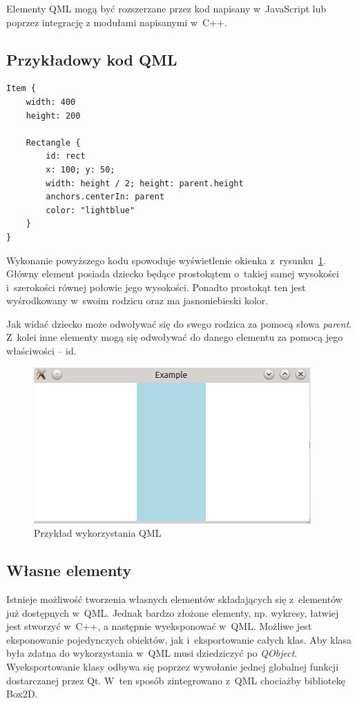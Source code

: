 Elementy QML mogą być rozszerzane przez kod napisany w~JavaScript lub poprzez integrację z modułami napisanymi w~C++.

\subsection{Przykładowy kod QML}

\begin{lstlisting}[caption=Przykład QML, label=code:qml]
Item {
	width: 400
	height: 200

	Rectangle {
		id: rect
		x: 100; y: 50;
		width: height / 2; height: parent.height
		anchors.centerIn: parent
		color: "lightblue"
	}
}
\end{lstlisting}

Wykonanie powyższego kodu spowoduje wyświetlenie okienka z~rysunku~\ref{rys:qml}. Główny element posiada dziecko będące prostokątem o~takiej samej wysokości i~szerokości równej połowie jego wysokości. Ponadto prostokąt ten jest wyśrodkowany w~swoim rodzicu oraz ma jasnoniebieski kolor.

Jak widać dziecko może odwoływać się do swego rodzica za pomocą słowa \textit{parent}. Z~kolei inne elementy mogą się odwoływać do danego elementu za pomocą jego właściwości -- id.

\begin{figure}[H]
\centering
\includegraphics{img/qml.png}
\caption{Przykład wykorzystania QML}\label{rys:qml}
\end{figure}

\subsection{Własne elementy}
Istnieje możliwość tworzenia własnych elementów składających się z~elementów już dostępnych w~QML. Jednak bardzo złożone elementy, np. wykresy, łatwiej jest stworzyć w~C++, a następnie wyeksponować w~QML. Możliwe jest eksponowanie pojedynczych obiektów, jak i~eksportowanie całych klas. Aby klasa była zdatna do wykorzystania w~QML musi dziedziczyć po \textit{QObject}. Wyeksportowanie klasy odbywa się poprzez wywołanie jednej globalnej funkcji dostarczanej przez Qt. W~ten sposób zintegrowano z~QML chociażby bibliotekę Box2D.

